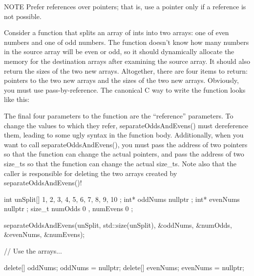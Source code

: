 \begin{myNotic}{NOTE}
Prefer references over pointers; that is, use a pointer only if a reference is not possible.
\end{myNotic}

Consider a function that splits an array of ints into two arrays: one of even numbers and one of odd numbers. The function doesn’t know how many numbers in the source array will be even or odd, so it should dynamically allocate the memory for the destination arrays after examining the source array. It should also return the sizes of the two new arrays. Altogether, there are four items to return: pointers to the two new arrays and the sizes of the two new arrays. Obviously, you must use pass-by-reference. The canonical C way to write the function looks like this:


The final four parameters to the function are the “reference” parameters. To change the values to which they refer, separateOddsAndEvens() must dereference them, leading to some ugly syntax in the function body. Additionally, when you want to call separateOddsAndEvens(), you must pass the address of two pointers so that the function can change the actual pointers, and pass the address of two size\_ts so that the function can change the actual size\_ts. Note also that the caller is responsible for deleting the two arrays created by separateOddsAndEvens()!

\begin{cpp}
int unSplit[] { 1, 2, 3, 4, 5, 6, 7, 8, 9, 10 };
int* oddNums { nullptr };
int* evenNums { nullptr };
size_t numOdds { 0 }, numEvens { 0 };

separateOddsAndEvens(unSplit, std::size(unSplit),
    &oddNums, &numOdds, &evenNums, &numEvens);

// Use the arrays...

delete[] oddNums; oddNums = nullptr;
delete[] evenNums; evenNums = nullptr;
\end{cpp}

